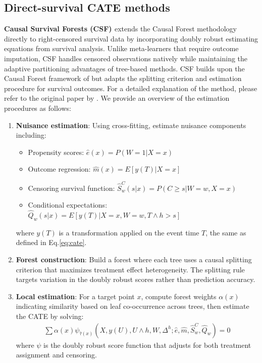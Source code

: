 \documentclass{article} %
\begin{document}
\subsection{Direct-survival CATE methods}
\textbf{Causal Survival Forests (CSF) \citep{cui2023estimating}} extends the Causal Forest methodology directly to right-censored survival data by incorporating doubly robust estimating equations from survival analysis. Unlike meta-learners that require outcome imputation, CSF handles censored observations natively while maintaining the adaptive partitioning advantages of tree-based methods.
CSF builds upon the Causal Forest framework of \citet{athey2019grf} but adapts the splitting criterion and estimation procedure for survival outcomes. For a detailed explanation of the method, please refer to the original paper by \citet{cui2023estimating}. We provide an overview of the estimation procedures as follows:
\begin{enumerate}[leftmargin=20pt, itemsep=0pt,parsep=0pt,partopsep=0pt,topsep=0pt]
    \item \textbf{Nuisance estimation}: Using cross-fitting, estimate nuisance components including:
        \begin{itemize}[leftmargin=15pt, itemsep=0pt]
            \item Propensity scores: $\hat{e}(x) = P(W = 1|X = x)$
            \item Outcome regression: $\hat{m}(x) = E[y(T)|X = x]$ 
            \item Censoring survival function: $\hat{S}^C_w(s|x) = P(C \geq s|W = w, X = x)$
            \item Conditional expectations: $\hat{Q}_w(s|x) = E[y(T)|X = x, W = w, T \wedge h > s]$
        \end{itemize}
        where $y(T)$ is a transformation applied on the event time $T$, the same as defined in Eq.\ref{eq:cate}.
    \item \textbf{Forest construction}: Build a forest where each tree uses a causal splitting criterion that maximizes treatment effect heterogeneity. The splitting rule targets variation in the doubly robust scores rather than prediction accuracy.
    \item \textbf{Local estimation}: For a target point $x$, compute forest weights $\alpha(x)$ indicating similarity based on leaf co-occurrence across trees, then estimate the CATE by solving:
        \begin{align*}
            \sum \alpha(x) \psi_{\hat{\tau}(x)}(X, y(U), U \wedge h, W, \Delta^h; \hat{e}, \hat{m}, \hat{S}^C_w, \hat{Q}_w) = 0
        \end{align*}
        where $\psi$ is the doubly robust score function that adjusts for both treatment assignment and censoring.
\end{enumerate}
\end{document}

